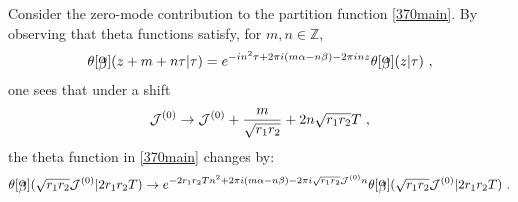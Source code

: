 \documentclass[11pt]{article}
\numberwithin{equation}{section}
\begin{document}
\begin{appendix}
Consider the zero-mode contribution to the partition function \eqref{370main}. By observing that theta functions satisfy, for $m,n\in{\mathbb Z}$,
\begin{align}
    \theta \! \begin{bmatrix} \vspace{-20pt} \\ \alpha  \\ \vspace{-20pt} \\ \beta \\ \vspace{-20pt} \end{bmatrix} \! ( z + m +n\tau  | \tau ) = e^{-in^2\tau + 2\pi i(m\alpha-n\beta)-2\pi i n z} \theta \! \begin{bmatrix} \vspace{-20pt} \\ \alpha  \\ \vspace{-20pt} \\ \beta \\ \vspace{-20pt} \end{bmatrix} \! ( z    | \tau )\ ,
\end{align}
one sees that under a shift
\begin{align}\label{IntJ}
{\cal J}^{(0)} \to   {\cal J}^{(0)}  + \frac{m}{\sqrt{r_1r_2}} + 2n\sqrt{r_1r_2}T \ ,
\end{align}
the theta function in \eqref{370main} changes by:
\begin{align}
\theta \! \begin{bmatrix} \vspace{-20pt} \\ \alpha  \\ \vspace{-20pt} \\ \beta \\ \vspace{-20pt} \end{bmatrix} \! ( \sqrt{r_1r_2}{\cal J}^{(0)}    | 2r_1r_2T ) \to  e^{- 2 r_1 r_2 T n^2 + 2 \pi i (m \alpha - n \beta) - 2 \pi i \sqrt{r_1 r_2} \mathcal{J}^{(0)} n    }\theta \! \begin{bmatrix} \vspace{-20pt} \\ \alpha  \\ \vspace{-20pt} \\ \beta \\ \vspace{-20pt} \end{bmatrix} \! ( \sqrt{r_1r_2}{\cal J}^{(0)}    | 2r_1r_2T ) \ .    

\end{align}
\end{appendix}
\end{document}
